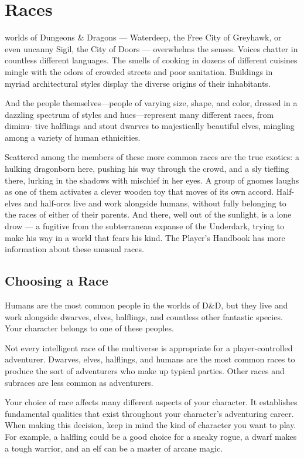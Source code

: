 \chapter{Races}
 worlds of Dungeons \& Dragons — Waterdeep, the Free City of Greyhawk, or even uncanny Sigil, the City of Doors — overwhelms the senses. Voices chatter in countless different languages. The smells of cooking in dozens of different cuisines mingle with the odors of crowded streets and poor sanitation. Buildings in myriad architectural styles display the diverse origins of their inhabitants.

And the people themselves—people of varying size, shape, and color, dressed in a dazzling spectrum of styles and hues—represent many different races, from diminu- tive halflings and stout dwarves to majestically beautiful elves, mingling among a variety of human ethnicities.

Scattered among the members of these more common races are the true exotics: a hulking dragonborn here, pushing his way through the crowd, and a sly tiefling there, lurking in the shadows with mischief in her eyes. A group of gnomes laughs as one of them activates a clever wooden toy that moves of its own accord. Half-elves and half-orcs live and work alongside humans, without fully belonging to the races of either of their parents. And there, well out of the sunlight, is a lone drow — a fugitive from the subterranean expanse of the Underdark, trying to make his way in a world that fears his kind. The Player’s Handbook has more information about these unusual races.

\section{Choosing a Race}
Humans are the most common people in the worlds of D\&D, but they live and work alongside dwarves, elves, halflings, and countless other fantastic species. Your character belongs to one of these peoples.

Not every intelligent race of the multiverse is appropriate for a player-controlled adventurer. Dwarves, elves, halflings, and humans are the most common races to produce the sort of adventurers who make up typical parties. Other races and subraces are less common as adventurers.

Your choice of race affects many different aspects of your character. It establishes fundamental qualities that exist throughout your character’s adventuring career. When making this decision, keep in mind the kind of character you want to play. For example, a halfling could be a good choice for a sneaky rogue, a dwarf makes a tough warrior, and an elf can be a master of arcane magic.

